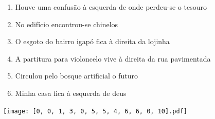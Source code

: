 \documentclass[12pt]{article}
\begin{document}
		 

\pagebreak


	\begin{enumerate}
		  \sffamily %
		  \large %


\vfill \item
Houve uma confusão	%
à esquerda
de onde perdeu-se o tesouro	%

\vfill \item
No edifício	%
encontrou-se chinelos	%

\vfill \item
O esgoto do bairro igapó fica	%
à direita
da lojinha	%

\vfill \item
A partitura para violoncelo vive	%
à direita
da rua pavimentada	%

\vfill \item
Circulou pelo bosque artificial	%
o futuro	%

\vfill \item
Minha casa fica	%
à esquerda
de deus	%
	\end{enumerate}
		  
		  \hfill

		  \vfill

\texttt{[image: [0, 0, 1, 3, 0, 5, 5, 4, 6, 6, 0, 10].pdf]}


	\hfill	  	  


\pagebreak			
\end{document}
